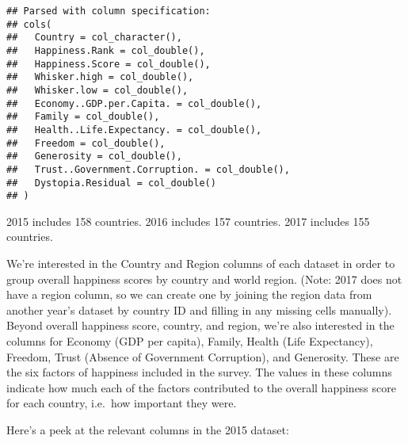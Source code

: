 \documentclass[]{article}
\newenvironment{Shaded}{\begin{snugshade}}{\end{snugshade}}
\newcommand{\DataTypeTok}[1]{\textcolor[rgb]{0.13,0.29,0.53}{#1}}
\newcommand{\KeywordTok}[1]{\textcolor[rgb]{0.13,0.29,0.53}{\textbf{#1}}}
\newcommand{\NormalTok}[1]{#1}
\newcommand{\OperatorTok}[1]{\textcolor[rgb]{0.81,0.36,0.00}{\textbf{#1}}}
\newcommand{\StringTok}[1]{\textcolor[rgb]{0.31,0.60,0.02}{#1}}
\begin{document}
\begin{verbatim}
## Parsed with column specification:
## cols(
##   Country = col_character(),
##   Happiness.Rank = col_double(),
##   Happiness.Score = col_double(),
##   Whisker.high = col_double(),
##   Whisker.low = col_double(),
##   Economy..GDP.per.Capita. = col_double(),
##   Family = col_double(),
##   Health..Life.Expectancy. = col_double(),
##   Freedom = col_double(),
##   Generosity = col_double(),
##   Trust..Government.Corruption. = col_double(),
##   Dystopia.Residual = col_double()
## )
\end{verbatim}

2015 includes 158 countries. 2016 includes 157 countries. 2017 includes
155 countries.

We're interested in the Country and Region columns of each dataset in
order to group overall happiness scores by country and world region.
(Note: 2017 does not have a region column, so we can create one by
joining the region data from another year's dataset by country ID and
filling in any missing cells manually). Beyond overall happiness score,
country, and region, we're also interested in the columns for Economy
(GDP per capita), Family, Health (Life Expectancy), Freedom, Trust
(Absence of Government Corruption), and Generosity. These are the six
factors of happiness included in the survey. The values in these columns
indicate how much each of the factors contributed to the overall
happiness score for each country, i.e.~how important they were.

Here's a peek at the relevant columns in the 2015 dataset:

\begin{Shaded}
\end{Shaded}
\end{document}
